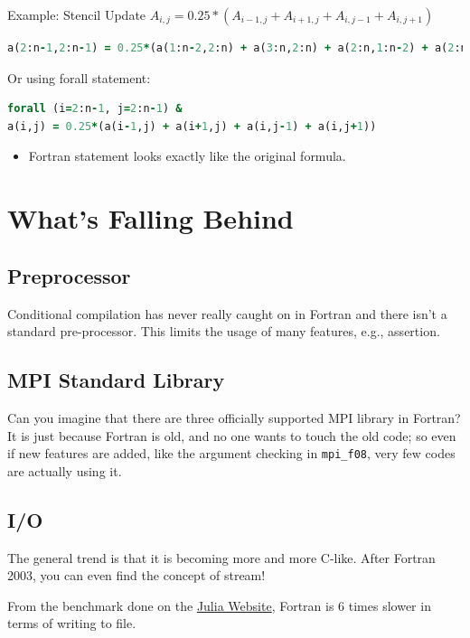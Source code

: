 \documentclass[11pt]{book} %
\begin{document}
Example: Stencil Update $A_{i,j}=0.25*(A_{i-1,j}+A_{i+1,j}+A_{i,j-1}+A_{i,j+1})$
\begin{lstlisting}[language=Fortran, caption=Stencil update 2D version 1]
a(2:n-1,2:n-1) = 0.25*(a(1:n-2,2:n) + a(3:n,2:n) + a(2:n,1:n-2) + a(2:n,3:n))
\end{lstlisting}
Or using forall statement:
\begin{lstlisting}[language=Fortran, caption=Stencil update 2D version 2]
forall (i=2:n-1, j=2:n-1) &
a(i,j) = 0.25*(a(i-1,j) + a(i+1,j) + a(i,j-1) + a(i,j+1))
\end{lstlisting}
\begin{itemize}
\item Fortran statement looks exactly like the original formula.
\end{itemize}

\section{What's Falling Behind}

\subsection{Preprocessor}

Conditional compilation has never really caught on in Fortran and there isn't a standard pre-processor.
This limits the usage of many features, e.g., assertion.

\subsection{MPI Standard Library}

Can you imagine that there are three officially supported MPI library in Fortran?
It is just because Fortran is old, and no one wants to touch the old code; so even if new features are added, like the argument checking in \verb|mpi_f08|, very few codes are actually using it.

\subsection{I/O}

The general trend is that it is becoming more and more C-like. After Fortran 2003, you can even find the concept of stream!

From the benchmark done on the \href{https://julialang.org/benchmarks/}{Julia Website}, Fortran is 6 times slower in terms of writing to file.
\end{document}
